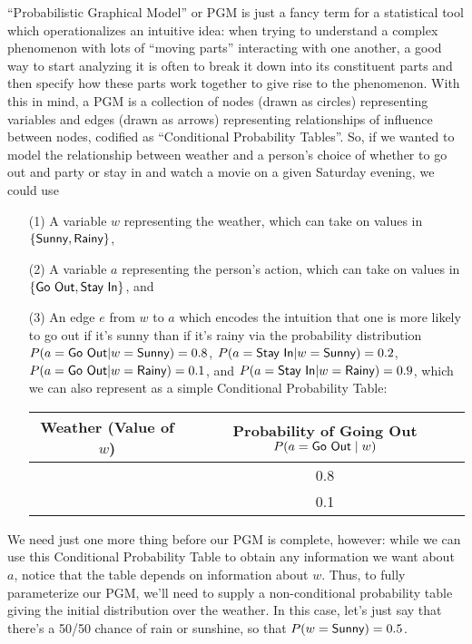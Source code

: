 “Probabilistic Graphical Model” or PGM is just a fancy term for a statistical tool which operationalizes an intuitive idea: when trying to understand a complex phenomenon with lots of “moving parts” interacting with one another, a good way to start analyzing it is often to break it down into its constituent parts and then specify how these parts work together to give rise to the phenomenon. With this in mind, a PGM is a collection of nodes (drawn as circles) representing variables and edges (drawn as arrows) representing relationships of influence between nodes, codified as “Conditional Probability Tables”. So, if we wanted to model the relationship between weather and a person’s choice of whether to go out and party or stay in and watch a movie on a given Saturday evening, we could use
\begin{enumerate}
	\item[(1)] A variable $w$ representing the weather, which can take on values in $\{\textsf{Sunny}{}, \textsf{Rainy}{}\}$,
	\item[(2)] A variable $a$ representing the person’s action, which can take on values in $\{\textsf{Go Out}{}, \textsf{Stay In}{}\}$, and 
	\item[(3)] An edge $e$ from $w$ to $a$ which encodes the intuition that one is more likely to go out if it’s sunny than if it’s rainy via the probability distribution $P(a = \textsf{Go Out}{} | w = \textsf{Sunny}{}) = 0.8$, $P(a = \textsf{Stay In}{} | w = \textsf{Sunny}{}) = 0.2$, $P(a = \textsf{Go Out}{} | w = \textsf{Rainy}{}) = 0.1$, and $P(a = \textsf{Stay In}{} | w = \textsf{Rainy}{}) = 0.9$, which we can also represent as a simple Conditional Probability Table:
	\begin{center}
		\begin{tabular}{cc} \hline
			Weather (Value of $w$) & Probability of Going Out $P(a=\textsf{Go Out}{} \; | \; w)$\\ \hline \hline
			\Sunny{} & 0.8 \\
			\Rainy{} & 0.1 \\\hline
		\end{tabular}
	\end{center}
\end{enumerate}

We need just one more thing before our PGM is complete, however: while we can use this Conditional Probability Table to obtain any information we want about $a$, notice that the table depends on information about $w$. Thus, to fully parameterize our PGM, we’ll need to supply a non-conditional probability table giving the initial distribution over the weather. In this case, let’s just say that there’s a 50/50 chance of rain or sunshine, so that $P(w = \textsf{Sunny}{}) = 0.5$.

